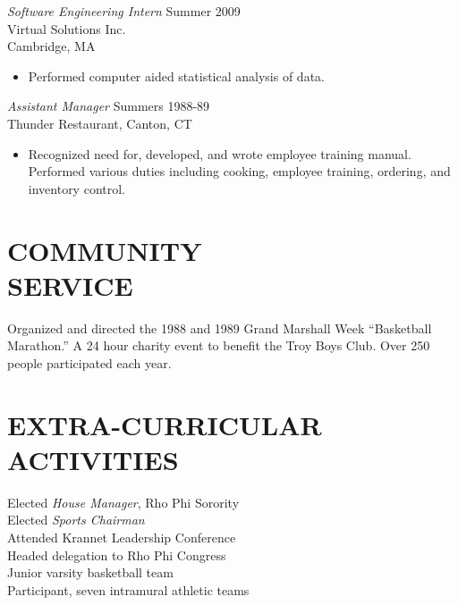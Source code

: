 \documentclass[margin]{res}
\begin{document}
\begin{resume}
                {\sl Software Engineering Intern} \hfill            Summer 2009 \\
                Virtual Solutions Inc. \\ 
                Cambridge, MA
                 \begin{itemize}  \itemsep -2pt %
                 \item Performed computer aided statistical analysis 
                    of data. 
                 \end{itemize} 
                {\sl Assistant Manager} \hfill        Summers 1988-89 \\
                Thunder Restaurant, Canton, CT
                  \begin{itemize}
                   \item Recognized need for, developed, and wrote 
                    employee training manual. Performed various 
                    duties including cooking, employee training, 
                    ordering, and inventory control. 
                  \end{itemize} 
 
\section{COMMUNITY \\ SERVICE}  Organized and directed the 1988 and 1989 Grand 
                 Marshall Week \newline ``Basketball Marathon.'' A 24 hour 
                charity event to benefit the Troy Boys Club. Over 
                250 people participated each year. 

\section{EXTRA-CURRICULAR \\ ACTIVITIES}             
            Elected {\it House Manager}, Rho Phi Sorority \\
            Elected {\it Sports Chairman} \\
            Attended Krannet Leadership Conference \\
                Headed delegation to Rho Phi Congress \\
                Junior varsity basketball team \\
                Participant, seven intramural athletic teams 
 

\end{resume}
\end{document}
